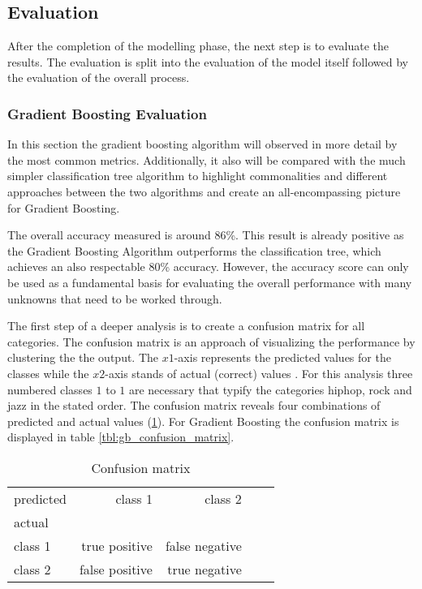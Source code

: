 \subsection{Evaluation}

After the completion of the modelling phase, the next step is to evaluate the results. The evaluation is split into 
the evaluation of the model itself followed by the evaluation of the overall process. 

\subsubsection{Gradient Boosting Evaluation}

In this section the gradient boosting algorithm will observed in more detail by the most common metrics. Additionally, it also
will be compared with the much simpler classification tree algorithm to highlight commonalities and different approaches between 
the two algorithms and create an all-encompassing picture for Gradient Boosting. 

The overall accuracy measured is around \(86\)\%. This result is already positive as the Gradient Boosting Algorithm outperforms 
the classification tree, which achieves an also respectable \(80\)\% accuracy. However, the accuracy score can only be used as a
fundamental basis for evaluating the overall performance with many unknowns that need to be worked through.

The first step of a deeper analysis is to create a confusion matrix for all categories. The confusion matrix is an approach of 
visualizing the performance by clustering the the output. The \(x1\)-axis represents the predicted values for the classes 
while the \(x2\)-axis stands of actual (correct) values \cite[p.235]{Davis_2006}. For this analysis three numbered classes \(1\) to \(1\) are necessary that 
typify the categories hiphop, rock and jazz in the stated order. The confusion matrix reveals four combinations of predicted 
and actual values (\ref{tbl:evaluation_confusion_matrix}). For Gradient Boosting the confusion matrix is displayed in table \ref{tbl:gb_confusion_matrix}.

\begin{table}[H]
  \centering
  \begin{tabular}{lrrrr}
    \toprule
    predicted & class 1         &  class 2          \\
    actual    &                 &                   \\
    \midrule
    class 1   &  true positive  &  false negative   \\
    class 2   &  false positive &  true negative    \\
    \bottomrule
    \end{tabular}
  \caption{Confusion matrix}%
  \label{tbl:evaluation_confusion_matrix}%
\end{table} 

